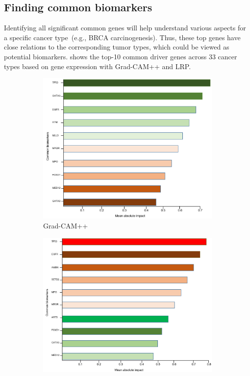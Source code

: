 \subsection{Finding common biomarkers}
Identifying all significant common genes will help understand various aspects for a specific cancer type~(e.g., BRCA carcinogenesis). Thus, these top genes have close relations to the corresponding tumor types, which could be viewed as potential biomarkers.  shows the top-10 common driver genes across 33 cancer types based on gene expression with Grad-CAM++ and LRP. 

\begin{figure}[h]
	\centering
	\begin{subfigure}{.48\linewidth}
		\centering
		\includegraphics[scale=0.4]{images/gcam_fi.png}
		\caption{Grad-CAM++}
        \label{fig:comgenegcam}
	\end{subfigure}
	\begin{subfigure}{0.48\linewidth}
		\centering
		\includegraphics[scale=0.4]{images/lrp_fi.png}

\end{subfigure}
\end{figure}
